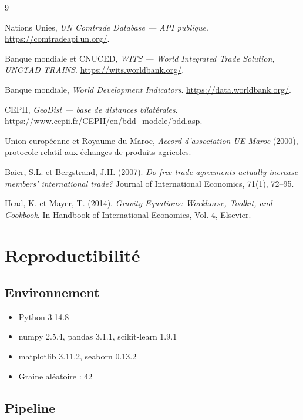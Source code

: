 \documentclass[11pt,a4paper]{article}
\begin{document}
\begin{thebibliography}{9}

Nations Unies, \emph{UN Comtrade Database — API publique}.
\url{https://comtradeapi.un.org/}.

Banque mondiale et CNUCED, \emph{WITS — World Integrated Trade Solution,
UNCTAD TRAINS}.
\url{https://wits.worldbank.org/}.

Banque mondiale, \emph{World Development Indicators}.
\url{https://data.worldbank.org/}.

CEPII, \emph{GeoDist — base de distances bilatérales}.
\url{https://www.cepii.fr/CEPII/en/bdd_modele/bdd.asp}.

Union européenne et Royaume du Maroc, \emph{Accord d'association
UE-Maroc} (2000), protocole relatif aux échanges de produits agricoles.

Baier, S.L. et Bergstrand, J.H. (2007).
\emph{Do free trade agreements actually increase members' international
trade?} Journal of International Economics, 71(1), 72--95.

Head, K. et Mayer, T. (2014).
\emph{Gravity Equations: Workhorse, Toolkit, and Cookbook}.
In Handbook of International Economics, Vol. 4, Elsevier.

\end{thebibliography}

\appendix

\section{Reproductibilité}\label{ann:repro}

\subsection{Environnement}

\begin{itemize}[leftmargin=1.2cm]
    \item Python 3.14.8
    \item numpy 2.5.4, pandas 3.1.1, scikit-learn 1.9.1
    \item matplotlib 3.11.2, seaborn 0.13.2
    \item Graine aléatoire : 42
\end{itemize}

\subsection{Pipeline}
\end{document}
